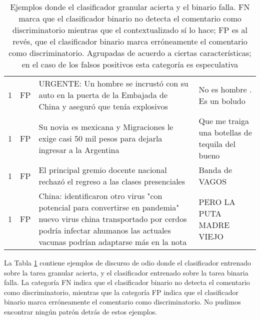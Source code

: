 \begin{table}[ht!]
\begin{tabular}{p{} p{} p{} p{}}
        1 & FP & URGENTE: Un hombre se incrustó con su auto en la puerta de la Embajada de China y aseguró que tenía explosivos & No es hombre . Es un boludo \\
        1 & FP & Su novia es mexicana y Migraciones le exige casi 50 mil pesos para dejarla ingresar a la Argentina &  Que me traiga una botellas de tequila del bueno \\
        1 & FP & El principal gremio docente nacional rechazó el regreso a las clases presenciales &Banda de VAGOS \\
        1 & FP & China: identificaron otro virus "con potencial para convertirse en pandemia" nuevo virus china transportado por cerdos podría infectar ahumanos las actuales vacunas podrían adaptarse más en la nota & PERO LA PUTA MADRE VIEJO \\
    \end{tabular}
    \caption{Ejemplos donde el clasificador granular acierta y el binario falla. FN marca que el clasificador binario no detecta el comentario como discriminatorio mientras que el contextualizado sí lo hace; FP es al revés, que el clasificador binario marca erróneamente el comentario como discriminatorio. Agrupadas de acuerdo a ciertas características; en el caso de los falsos positivos esta categoría es especulativa}
    \label{tab:fine_vs_plain_comparison}
\end{table}

La Tabla \ref{tab:fine_vs_plain_comparison} contiene ejemplos de discurso de odio donde el clasificador entrenado sobre la tarea granular acierta, y el clasificador entrenado sobre la tarea binaria falla. La categoría FN indica que el clasificador binario no detecta el comentario como discriminatorio, mientras que la categoría FP indica que el clasificador binario marca erróneamente el comentario como discriminatorio. No pudimos encontrar ningún patrón detrás de estos ejemplos.